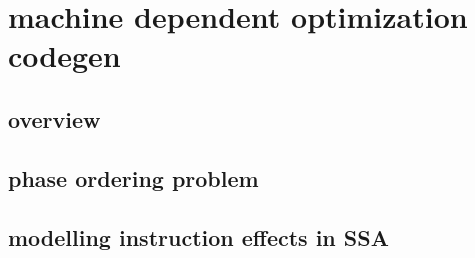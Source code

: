\chapter*{machine dependent optimization codegen}



\section{overview}
\section{phase ordering problem}
\section{modelling instruction effects in SSA}
